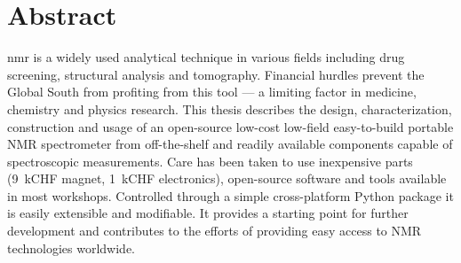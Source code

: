 \chapter*{Abstract}

\acrfull{nmr} is a widely used analytical technique in various fields including drug screening, structural analysis and tomography. Financial hurdles prevent the Global South from profiting from this tool --- a limiting factor in medicine, chemistry and physics research.
This thesis describes the design, characterization, construction and usage of an open-source low-cost low-field easy-to-build portable NMR spectrometer from off-the-shelf and readily available components capable of spectroscopic measurements. Care has been taken to use inexpensive parts (\approx{}\qty{9}{kCHF} magnet, \approx{}\qty{1}{kCHF} electronics), open-source software and tools available in most workshops. Controlled through a simple cross-platform Python package it is easily extensible and modifiable. It provides a starting point for further development and contributes to the efforts of providing easy access to NMR technologies worldwide.